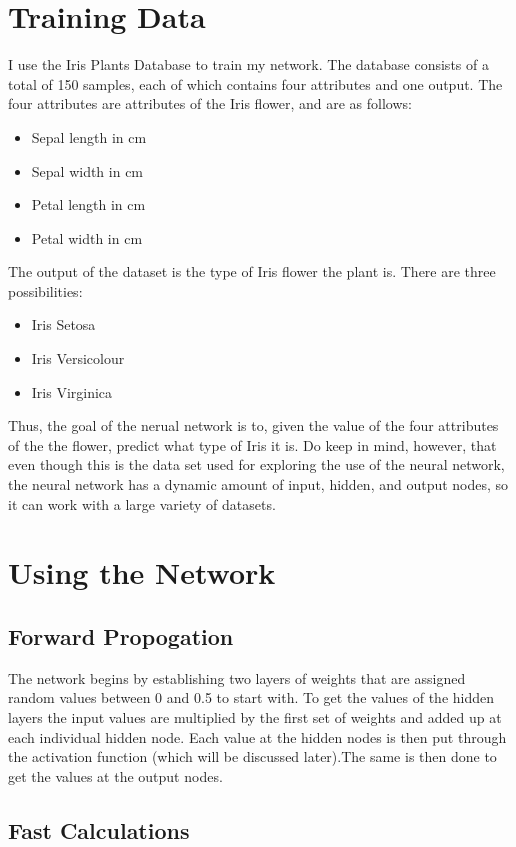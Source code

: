 \documentclass[12pt]{article}
\begin{document}
\section{Training Data}
I use the Iris Plants Database to train my network. The database consists of a total of 150 samples, each of which contains four attributes and one output. The four attributes are
attributes of the Iris flower, and are as follows:
\begin{itemize}
\item Sepal length in cm
\item Sepal width in cm
\item Petal length in cm
\item Petal width in cm
\end{itemize}
The output of the dataset is the type of Iris flower the plant is. There are three possibilities:
\begin{itemize}
\item Iris Setosa
\item Iris Versicolour
\item Iris Virginica
\end{itemize}
Thus, the goal of the nerual network is to, given the value of the four attributes of the the flower, predict what type of Iris it is.
Do keep in mind, however, that even though this is the data set used for exploring the use of the neural network, the neural network has a
dynamic amount of input, hidden, and output nodes, so it can work with a large variety of datasets.

\section{Using the Network}
\subsection{Forward Propogation}

The network begins by establishing two layers of weights that are assigned random values
between 0 and 0.5 to start with. To get the values of the hidden layers the input values are
multiplied by the first set of weights and added up at each individual hidden node. Each value at
the hidden nodes is then put through the activation function (which will be discussed later).The
same is then done to get the values at the output nodes.

\subsection{Fast Calculations}
\end{document}
